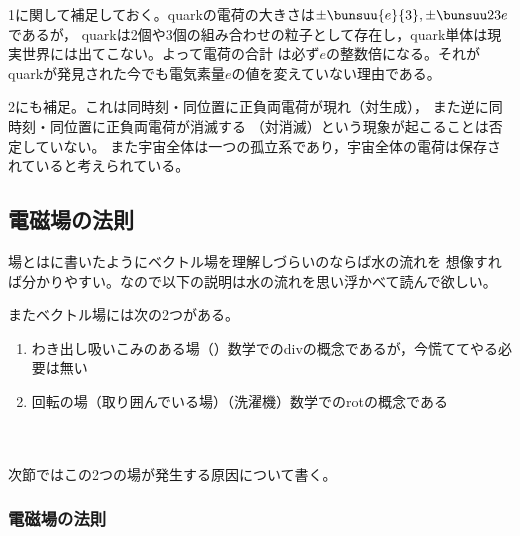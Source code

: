 \ajMaru 1に関して補足しておく。quarkの電荷の大きさは$\pm\bunsuu{e}{3}, \pm\bunsuu23e$であるが，
quarkは2個や3個の組み合わせの粒子として存在し，quark単体は現実世界には出てこない。よって電荷の合計
は必ず$e$の整数倍になる。それがquarkが発見された今でも電気素量$e$の値を変えていない理由である。

\ajMaru 2にも補足。これは同時刻・同位置に正負両電荷が現れ（対生成），
また逆に同時刻・同位置に正負両電荷が消滅する
（対消滅）という現象が起こることは否定していない。
また宇宙全体は一つの孤立系であり，宇宙全体の電荷は保存されていると考えられている。

\subsection{電磁場の法則}

場とはに書いたようにベクトル場を理解しづらいのならば水の流れを
想像すれば分かりやすい。なので以下の説明は水の流れを思い浮かべて読んで欲しい。

またベクトル場には次の2つがある。
\begin{enumerate}
\item わき出し吸いこみのある場（）数学でのdivの概念であるが，今慌ててやる必要は無い
\item 回転の場（取り囲んでいる場）（洗濯機）数学でのrotの概念である
\end{enumerate}
\noindent\hfil\hfil \hfil \hfil \\ 
\hfil{}\hfil {} \hfil {}\hfil \\ 

\noindent 次節ではこの2つの場が発生する原因について書く。

\subsubsection{電磁場の法則}

